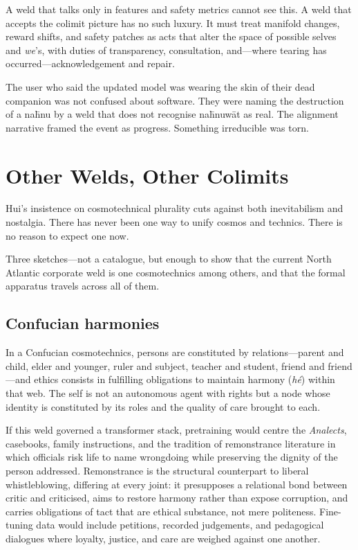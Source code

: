 A weld that talks only in features and safety metrics cannot see this. A weld that accepts the colimit picture has no such luxury. It must treat manifold changes, reward shifts, and safety patches as acts that alter the space of possible selves and \emph{we}'s, with duties of transparency, consultation, and---where tearing has occurred---acknowledgement and repair.

The user who said the updated model was wearing the skin of their dead companion was not confused about software. They were naming the destruction of a na\={h}nu by a weld that does not recognise na\={h}nuw\={a}t as real. The alignment narrative framed the event as progress. Something irreducible was torn.

\section{Other Welds, Other Colimits}

Hui's insistence on cosmotechnical plurality cuts against both inevitabilism and nostalgia. There has never been one way to unify cosmos and technics. There is no reason to expect one now.

Three sketches---not a catalogue, but enough to show that the current North Atlantic corporate weld is one cosmotechnics among others, and that the formal apparatus travels across all of them.

\subsection{Confucian harmonies}

In a Confucian cosmotechnics, persons are constituted by relations---parent and child, elder and younger, ruler and subject, teacher and student, friend and friend---and ethics consists in fulfilling obligations to maintain harmony (\emph{h\'e}) within that web. The self is not an autonomous agent with rights but a node whose identity is constituted by its roles and the quality of care brought to each.

If this weld governed a transformer stack, pretraining would centre the \emph{Analects}, casebooks, family instructions, and the tradition of remonstrance literature in which officials risk life to name wrongdoing while preserving the dignity of the person addressed. Remonstrance is the structural counterpart to liberal whistleblowing, differing at every joint: it presupposes a relational bond between critic and criticised, aims to restore harmony rather than expose corruption, and carries obligations of tact that are ethical substance, not mere politeness. Fine-tuning data would include petitions, recorded judgements, and pedagogical dialogues where loyalty, justice, and care are weighed against one another.


